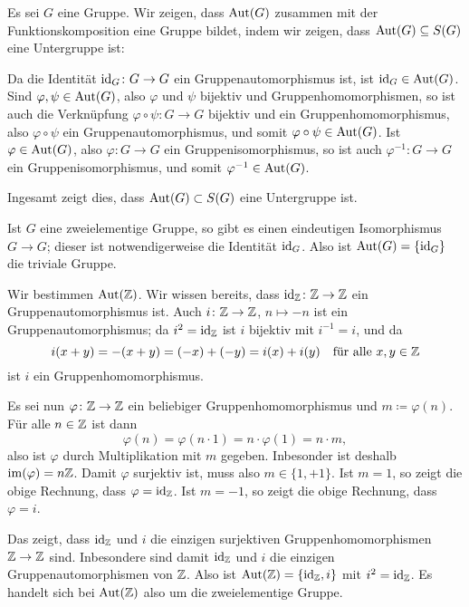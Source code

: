 Es sei $G$ eine Gruppe. Wir zeigen, dass $\mathrm{Aut}(G)$ zusammen mit der Funktionskomposition eine Gruppe bildet, indem wir zeigen, dass $\mathrm{Aut}(G) \subseteq S(G)$ eine Untergruppe ist:

Da die Identität $\mathrm{id}_G \colon G \to G$ ein Gruppenautomorphismus ist, ist $\mathrm{id}_G \in \mathrm{Aut}(G)$. Sind $\varphi, \psi \in \mathrm{Aut}(G)$, also $\varphi$ und $\psi$ bijektiv und Gruppenhomomorphismen, so ist auch die Verknüpfung $\varphi \circ \psi \colon G \to G$ bijektiv und ein Gruppenhomomorphismus, also $\varphi \circ \psi$ ein Gruppenautomorphismus, und somit $\varphi \circ \psi \in \mathrm{Aut}(G)$. Ist $\varphi \in \mathrm{Aut}(G)$, also $\varphi \colon G \to G$ ein Gruppenisomorphismus, so ist auch $\varphi^{-1} \colon G \to G$ ein Gruppenisomorphismus, und somit $\varphi^{-1} \in \mathrm{Aut}(G)$.

Ingesamt zeigt dies, dass $\mathrm{Aut}(G) \subset S(G)$ eine Untergruppe ist.

\begin{bsp}
 Ist $G$ eine zweielementige Gruppe, so gibt es einen eindeutigen Isomorphismus $G \to G$; dieser ist notwendigerweise die Identität $\mathrm{id}_G$. Also ist $\mathrm{Aut}(G) = \{\mathrm{id}_G\}$ die triviale Gruppe.
\end{bsp}

\begin{bsp}
 Wir bestimmen $\mathrm{Aut}(\mathbb{Z})$. Wir wissen bereits, dass $\mathrm{id}_{\mathbb{Z}} \colon \mathbb{Z} \to \mathbb{Z}$ ein Gruppenautomorphismus ist. Auch $i \colon \mathbb{Z} \to \mathbb{Z}$, $n \mapsto -n$ ist ein Gruppenautomorphismus; da $i^2 = \mathrm{id}_{\mathbb{Z}}$ ist $i$ bijektiv mit $i^{-1} = i$, und da
 \[
  i(x+y)
  = -(x+y)
  = (-x) + (-y)
  = i(x) + i(y)
  \quad
  \text{für alle $x,y \in \mathbb{Z}$}
 \]
 ist $i$ ein Gruppenhomomorphismus.
 
 Es sei nun $\varphi \colon \mathbb{Z} \to \mathbb{Z}$ ein beliebiger Gruppenhomomorphismus und $m \coloneqq \varphi(n)$. Für alle $n \in \mathbb{Z}$ ist dann
 \[
  \varphi(n)
  = \varphi(n \cdot 1)
  = n \cdot \varphi(1)
  = n \cdot m,
 \]
 also ist $\varphi$ durch Multiplikation mit $m$ gegeben. Inbesonder ist deshalb $\mathrm{im}(\varphi) = n\mathbb{Z}$. Damit $\varphi$ surjektiv ist, muss also $m \in \{1,+1\}$. Ist $m = 1$, so zeigt die obige Rechnung, dass $\varphi = \mathrm{id}_{\mathbb{Z}}$. Ist $m = -1$, so zeigt die obige Rechnung, dass $\varphi = i$.
 
 Das zeigt, dass $\mathrm{id}_{\mathbb{Z}}$ und $i$ die einzigen surjektiven Gruppenhomomorphismen $\mathbb{Z} \to \mathbb{Z}$ sind. Inbesondere sind damit $\mathrm{id}_{\mathbb{Z}}$ und $i$ die einzigen Gruppenautomorphismen von $\mathbb{Z}$. Also ist $\mathrm{Aut}(\mathbb{Z}) = \{\mathrm{id}_{\mathbb{Z}}, i\}$ mit $i^2 = \mathrm{id}_{\mathbb{Z}}$. Es handelt sich bei $\mathrm{Aut}(\mathbb{Z})$ also um die zweielementige Gruppe.
\end{bsp}


